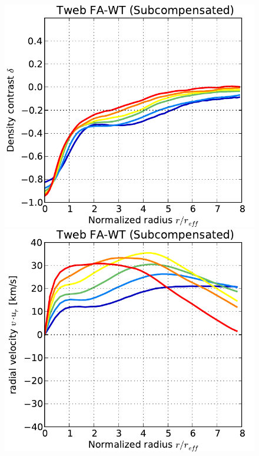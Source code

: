 \documentclass[a4,useAMS,usenatbib,usegraphicx]{latex/mn2e}
\begin{document}
\begin{figure}
\centering
  \includegraphics[trim = 1mm 0mm 5mm 0mm, clip, keepaspectratio=true,
  width=0.24\textheight]{./figures/voids_density_TwebFAG0.pdf}
  \includegraphics[trim = 1mm 0mm 5mm 0mm, clip, keepaspectratio=true,
  width=0.24\textheight]{./figures/voids_velocity_TwebFAG0.pdf}

\end{figure}
\end{document}

